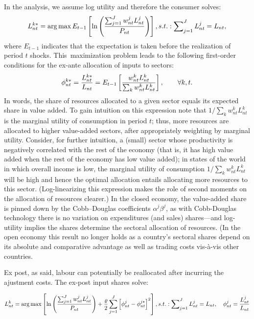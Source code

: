 \documentclass{article}
\begin{document}
In the analysis, we assume log utility and therefore the consumer solves: 
\begin{equation}
L_{nt}^{k\ast }=\arg \max E_{t-1}\left[ \ln \left( \frac{%
\sum_{j=1}^{J}w_{nt}^{j}L_{nt}^{j}}{P_{nt}}\right) \right]
,s.t.:\sum\nolimits_{j=1}^{J}L_{nt}^{j}=L_{nt},  \label{eq:log:utility}
\end{equation}%
where $E_{t-1}$ indicates that the expectation is taken before the
realization of period $t$ shocks. This\ maximization problem leads to the
following first-order conditions for the ex-ante allocation of inputs to
sectors: 
\begin{equation}
\phi _{nt}^{k\ast }=\frac{L_{nt}^{k\ast }}{L_{nt}}=E_{t-1}\left[ \frac{%
w_{nt}^{k}L_{nt}^{k}}{\sum_{k}w_{nt}^{k}L_{nt}^{k}}\right] ,\qquad \forall
k,t.  \label{eq:FOC}
\end{equation}%
In words, the share of resources allocated to a given sector equals its
expected share in value added. To gain intuition on this expression note
that $1/\sum_{k}w_{nt}^{k}L_{nt}^{k}$ is the marginal utility of consumption
in period $t$; thus, more resources are allocated to higher value-added
sectors, after appropriately weighting by marginal utility. Consider, for
further intuition, a (small) sector whose productivity is negatively
correlated with the rest of the economy (that is, it has high value added
when the rest of the economy has low value added); in states of the world in
which overall income is low, the marginal utility of consumption $%
1/\sum_{k}w_{nt}^{k}L_{nt}^{k}$ will be high and hence the optimal
allocation entails allocating more resources to this sector.
(Log-linearizing this expression makes the role of second moments on the
allocation of resources clearer.) In the closed economy, the value-added
share is pinned down by the Cobb--Douglas coefficients $\alpha ^{j}\beta ^{j}
$, as with Cobb-Douglas technology there is no variation on expenditures
(and sales) shares---and log-utility implies the shares determine the
sectoral allocation of resources. (In the open economy this result no longer
holds as a country's sectoral shares depend on its absolute and comparative
advantage as well as trading costs vis-\`{a}-vis other countries.

Ex post, as said, labour can potentially be reallocated after incurring the
ajustment costs. The ex-post input shares solve:

\begin{equation}
L_{nt}^{k}=\arg \max \left[ \ln \left( \frac{%
\sum_{j=1}^{J}w_{nt}^{j}L_{nt}^{j}}{P_{nt}}\right) +\frac{\varrho }{2}%
\sum_{j=1}^{J}\left[ \phi _{nt}^{j}-\phi _{nt}^{j\ast }\right] ^{2}\right]
,s.t.:\sum\nolimits_{j=1}^{J}L_{nt}^{j}=L_{nt},\text{ }\phi _{nt}^{j}=\frac{%
L_{nt}^{j}}{L_{nt}}
\end{equation}
\end{document}
